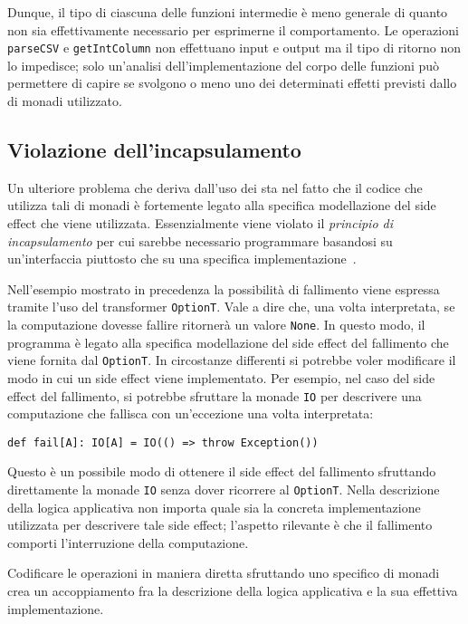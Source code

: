 Dunque, il tipo di ciascuna delle funzioni intermedie è meno generale di quanto non sia effettivamente necessario per esprimerne il comportamento. Le operazioni \lstinline{parseCSV} e \lstinline{getIntColumn} non effettuano input e output ma il tipo di ritorno non lo impedisce; solo un'analisi dell'implementazione del corpo delle funzioni può permettere di capire se svolgono o meno uno dei determinati effetti previsti dallo  di monadi utilizzato.

\subsection{Violazione dell'incapsulamento}
Un ulteriore problema che deriva dall'uso dei  sta nel fatto che il codice che utilizza tali  di monadi è fortemente legato alla specifica modellazione del side effect che viene utilizzata. Essenzialmente viene violato il \emph{principio di incapsulamento} per cui sarebbe necessario programmare basandosi su un'interfaccia piuttosto che su una specifica implementazione~\cite[p.~94]{cit:clean-code-a-handbook-of-agile-software-craftsmanship}.

Nell'esempio mostrato in precedenza la possibilità di fallimento viene espressa tramite l'uso del transformer \lstinline{OptionT}. Vale a dire che, una volta interpretata, se la computazione dovesse fallire ritornerà un valore \lstinline{None}. In questo modo, il programma è legato alla specifica modellazione del side effect del fallimento che viene fornita dal  \lstinline{OptionT}.
In circostanze differenti si potrebbe voler modificare il modo in cui un side effect viene implementato. Per esempio, nel caso del side effect del fallimento, si potrebbe sfruttare la monade \lstinline{IO} per descrivere una computazione che fallisca con un'eccezione una volta interpretata:
\begin{lstlisting}[language=scala3]
def fail[A]: IO[A] = IO(() => throw Exception())
\end{lstlisting}
Questo è un possibile modo di ottenere il side effect del fallimento sfruttando direttamente la monade \lstinline{IO} senza dover ricorrere al  \lstinline{OptionT}. Nella descrizione della logica applicativa non importa quale sia la concreta implementazione utilizzata per descrivere tale side effect; l'aspetto rilevante è che il fallimento comporti l'interruzione della computazione.

Codificare le operazioni in maniera diretta sfruttando uno specifico  di monadi crea un accoppiamento fra la descrizione della logica applicativa e la sua effettiva implementazione.
